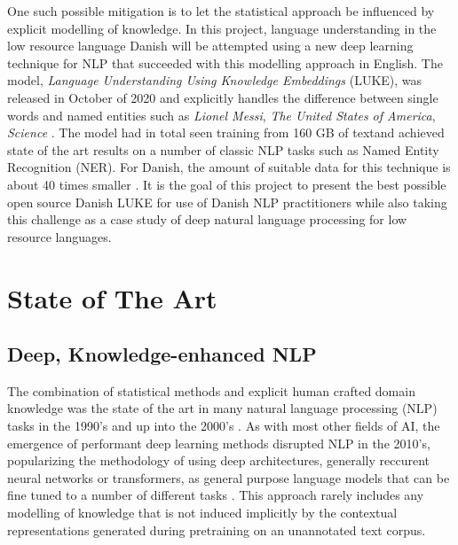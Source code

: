 \documentclass[main.tex]{subfiles}
\begin{document}
One such possible mitigation is to let the statistical approach be influenced by explicit modelling of knowledge.
In this project, language understanding in the low resource language Danish will be attempted using a new deep learning technique for NLP that succeeded with this modelling approach in English.
The model, \emph{Language Understanding Using Knowledge Embeddings} (LUKE), was released in October of 2020 and explicitly handles the difference between single words and named entities such as \emph{Lionel Messi}, \emph{The United States of America}, \emph{Science} \cite{yamada2020luke}.
The model had in total seen training from 160 GB of text\footnotemark and achieved state of the art results on a number of classic NLP tasks such as Named Entity Recognition (NER).
For Danish, the amount of suitable data for this technique is about 40 times smaller \footnotemark.
It is the goal of this project to present the best possible open source Danish LUKE for use of Danish NLP practitioners while also taking this challenge as a case study of deep natural language processing for low resource languages.

\section{State of The Art}
\label{sota}

\subsection{Deep, Knowledge-enhanced NLP}
The combination of statistical methods and explicit human crafted domain knowledge was the state of the art in many natural language processing (NLP) tasks in the 1990's and up into the 2000's \cite[Sec. 22.5]{russell2016ai}.
As with most other fields of AI, the emergence of performant deep learning methods disrupted NLP in the 2010's, popularizing the methodology of using deep architectures, generally reccurent neural networks or transformers, as general purpose language models that can be fine tuned to a number of different tasks \cite{otter18dlnlp}.
This approach rarely includes any modelling of knowledge that is not induced implicitly by the contextual representations generated during pretraining on an unannotated text corpus.
\end{document}
